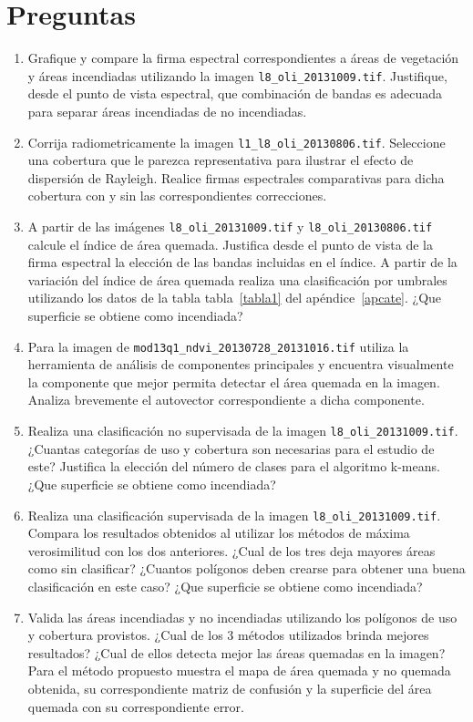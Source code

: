 \documentclass[hidelinks,12pt]{article}
\begin{document}
\section{Preguntas}
\begin{enumerate}
\item Grafique y compare la firma espectral correspondientes a áreas de
    vegetación y áreas incendiadas utilizando la imagen
        \texttt{l8\_oli\_20131009.tif}. Justifique, desde el punto de vista espectral, que combinación de bandas es adecuada para separar áreas incendiadas de no incendiadas.
\item Corrija radiometricamente la imagen \texttt{l1\_l8\_oli\_20130806.tif}. Seleccione una cobertura que le parezca representativa para ilustrar el efecto de dispersión de Rayleigh. Realice firmas espectrales comparativas para dicha cobertura con y sin las correspondientes correcciones.
\item A partir de las imágenes \texttt{l8\_oli\_20131009.tif} y
    \texttt{l8\_oli\_20130806.tif} calcule el índice de área quemada. Justifica desde el punto de vista de la firma espectral la elección de las bandas incluidas en el índice. A partir de la variación del índice de área quemada realiza una clasificación por umbrales utilizando los datos de la tabla tabla~\ref{tabla1} del ap\'endice~\ref{apcate}. ¿Que superficie se obtiene como incendiada?
\item Para la imagen de \texttt{mod13q1\_ndvi\_20130728\_20131016.tif} utiliza la herramienta de análisis de componentes principales y encuentra visualmente la componente que mejor permita detectar el área quemada en la imagen. Analiza brevemente el autovector correspondiente a dicha componente.
\item  Realiza una clasificación no supervisada de la imagen
    \texttt{l8\_oli\_20131009.tif}. ¿Cuantas categorías de uso y cobertura son necesarias para el estudio de este? Justifica la elección del número de clases para el algoritmo k-means. ¿Que superficie se obtiene como incendiada?
\item Realiza una clasificación supervisada de la imagen
    \texttt{l8\_oli\_20131009.tif}. Compara los resultados obtenidos al utilizar los métodos de máxima verosimilitud con los dos anteriores. ¿Cual de los tres deja mayores áreas como sin clasificar? ¿Cuantos polígonos deben crearse para obtener una buena clasificación en este caso? ¿Que superficie se obtiene como incendiada?
\item Valida las áreas incendiadas y no incendiadas utilizando los polígonos de uso y cobertura provistos. ¿Cual de los 3 métodos utilizados brinda mejores resultados? ¿Cual de ellos detecta mejor las áreas quemadas en la imagen? Para el método propuesto muestra el mapa de área quemada y no quemada obtenida, su correspondiente matriz de confusión y la superficie del área quemada con su correspondiente error.
\end{enumerate}
\newpage
\appendix
\end{document}
